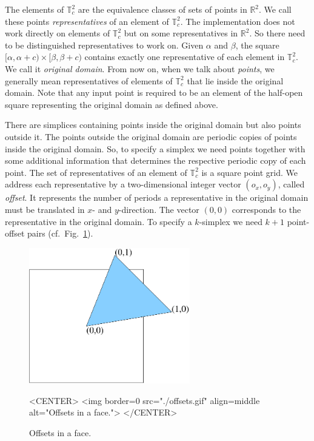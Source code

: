 The elements of $\mathbb T_c^2$ are the equivalence classes of sets of
points in $\mathbb R^2$. We call these points \textit{representatives}
of an element of $\mathbb T_c^2$. The implementation does not work
directly on elements of $\mathbb T_c^2$ but on some representatives in
$\mathbb R^2$. So there need to be distinguished representatives to
work on. Given $\alpha$ and $\beta$, the square
$[\alpha,\alpha+c)\times[\beta,\beta+c)$ contains exactly one
representative of each element in $\mathbb T_c^2$. We call it
\emph{original domain}. From now on, when we talk about
\textit{points}, we generally mean representatives of elements of
$\mathbb T_c^2$ that lie inside the original domain. Note that any
input point is required to be an element of the half-open square
representing the original domain as defined above.

There are simplices containing points inside the original domain but
also points outside it. The points outside the original domain are
periodic copies of points inside the original domain. So, to
specify a simplex we need points together with some additional
information that determines the respective periodic copy of each point. 
The set of representatives of an element of $\mathbb T_c^2$ is a square
point grid. We address each representative by a two-dimensional
integer vector $(o_x,o_y)$, called \emph{offset}. It
represents the number of periods a representative in the original
domain must be translated in $x$- and $y$-direction.
The vector $(0,0)$ corresponds to the representative in the original
domain. To specify a $k$-simplex we need $k+1$ point-offset pairs
(cf.\ Fig.~\ref{P2Triangulation2-fig-offsets}). 

\begin{figure}[htbp]
\begin{ccTexOnly}
\begin{center} 
\includegraphics[width=7cm]{Periodic_2_triangulation_2/offsets} 
\end{center}
\end{ccTexOnly}
\begin{ccHtmlOnly}
<CENTER>
<img border=0 src="./offsets.gif" align=middle alt="Offsets in a face.">
</CENTER>
\end{ccHtmlOnly}
\caption{Offsets in a face.
\label{P2Triangulation2-fig-offsets}}
\end{figure} 

